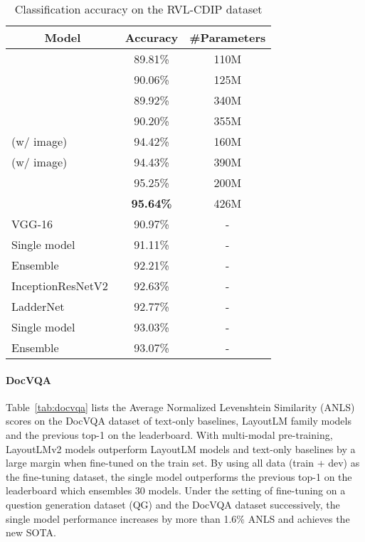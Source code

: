 \documentclass{article} \usepackage{iclr2021_conference,times}
\begin{document}
\begin{table}[t]
    \centering
    \small
    \begin{tabular}{lcc}
    \toprule
     \multicolumn{1}{c}{\bf Model} & \bf Accuracy   & \bf \#Parameters\\\midrule
       &  89.81\% & 110M\\
       &  90.06\% & 125M\\
        & 89.92\%    & 340M\\
       &  90.20\% & 355M\\\midrule
 (w/ image) & 94.42\% & 160M \\
      (w/ image) & 94.43\% & 390M \\
     \midrule
      & 95.25\% & 200M \\
      & \bf 95.64\% & 426M \\
     \midrule\midrule
      VGG-16~\citep{Afzal2017CuttingTE} & 90.97\% &- \\
     Single model~\citep{Das2018DocumentIC} & 91.11\% & -\\
     Ensemble~\citep{Das2018DocumentIC} & 92.21\% & -\\
     InceptionResNetV2\tablefootnote{\scriptsize \url{ https://medium.com/@jdegange85/benchmarking-modern-cnn-architectures-to-rvl-cdip-9dd0b7ec2955}}~\citep{Szegedy2016Inceptionv4IA} & 92.63\% & -\\
     LadderNet~\citep{ijcai2019-466} & 92.77\% & -\\
     Single model~\citep{Dauphinee2019ModularMA} &  93.03\% & -\\
     Ensemble~\citep{Dauphinee2019ModularMA} &  93.07\% & -\\
     \bottomrule
    \end{tabular}
    \caption{Classification accuracy on the RVL-CDIP dataset}
    \label{tab:rvlcdip}
\end{table}


\paragraph{DocVQA}
Table~\ref{tab:docvqa} lists the Average Normalized Levenshtein Similarity (ANLS) scores on the DocVQA dataset of text-only baselines, LayoutLM family models and the previous top-1 on the leaderboard. With multi-modal pre-training, LayoutLMv2 models outperform LayoutLM models and text-only baselines by a large margin when fine-tuned on the train set. By using all data (train + dev) as the fine-tuning dataset, the  single model outperforms the previous top-1 on the leaderboard which ensembles 30 models. Under the setting of fine-tuning  on a question generation dataset (QG) and the DocVQA dataset successively, the single model performance increases by more than 1.6\% ANLS and achieves the new SOTA.
\end{document}
